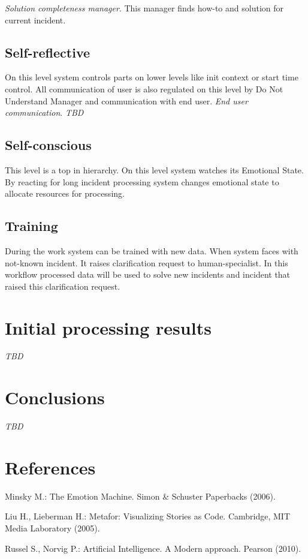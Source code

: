 \documentclass{llncs}
\begin{document}
\emph{Solution completeness manager}. This manager finds how-to and solution for current incident.

\subsection{Self-reflective}
On this level system controls parts on lower levels like init context or start time control. All communication of user is also regulated on this level by Do Not Understand Manager and communication with end user.
\emph{End user communication}. \emph{TBD}

\subsection{Self-conscious}
This level is a top in hierarchy. On this level system watches its Emotional State. By reacting for long incident processing system changes emotional state to allocate resources for processing.

\subsection{Training}
During the work system can be trained with new data. When system faces with not-known incident. It raises clarification request to human-specialist. In this workflow processed data will be used to solve new incidents and incident that raised this clarification request. 

\section{Initial processing results}

\emph{TBD}

\section{Conclusions}

\emph{TBD}

\section{References}

\begin{thebibliography}{[MT1]}

Minsky M.:
The Emotion Machine.
Simon \& Schuster Paperbacks  (2006).

Liu H., Lieberman H.:
Metafor: Visualizing Stories as Code.
Cambridge, MIT Media Laboratory  (2005).

Russel S., Norvig P.:
Artificial Intelligence. A Modern approach.
Pearson (2010).

\end{thebibliography}
\end{document}
